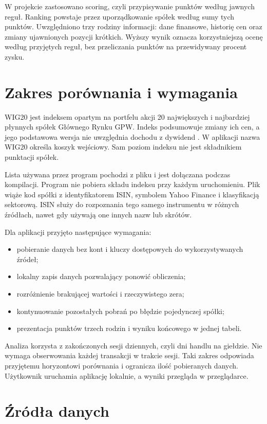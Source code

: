\documentclass[12pt,a4paper,twoside]{report}
\begin{document}
W projekcie zastosowano scoring, czyli przypisywanie punktów według jawnych reguł. Ranking powstaje przez uporządkowanie spółek według sumy tych punktów. Uwzględniono trzy rodziny informacji: dane finansowe, historię cen oraz zmiany ujawnionych pozycji krótkich. Wyższy wynik oznacza korzystniejszą ocenę według przyjętych reguł, bez przeliczania punktów na przewidywany procent zysku.

\section{Zakres porównania i wymagania}

WIG20 jest indeksem opartym na portfelu akcji 20 największych i najbardziej płynnych spółek Głównego Rynku GPW. Indeks podsumowuje zmiany ich cen, a jego podstawowa wersja nie uwzględnia dochodu z dywidend \cite{gpwbenchmark}. W aplikacji nazwa WIG20 określa koszyk wejściowy. Sam poziom indeksu nie jest składnikiem punktacji spółek.

Lista używana przez program pochodzi z pliku  i jest dołączana podczas kompilacji. Program nie pobiera składu indeksu przy każdym uruchomieniu. Plik wiąże kod spółki z identyfikatorem ISIN, symbolem Yahoo Finance i klasyfikacją sektorową. ISIN służy do rozpoznania tego samego instrumentu w różnych źródłach, nawet gdy używają one innych nazw lub skrótów.

Dla aplikacji przyjęto następujące wymagania:
\begin{itemize}
    \item pobieranie danych bez kont i kluczy dostępowych do wykorzystywanych źródeł;
    \item lokalny zapis danych pozwalający ponowić obliczenia;
    \item rozróżnienie brakującej wartości i rzeczywistego zera;
    \item kontynuowanie pozostałych pobrań po błędzie pojedynczej spółki;
    \item prezentacja punktów trzech rodzin i wyniku końcowego w jednej tabeli.
\end{itemize}

Analiza korzysta z zakończonych sesji dziennych, czyli dni handlu na giełdzie. Nie wymaga obserwowania każdej transakcji w trakcie sesji. Taki zakres odpowiada przyjętemu horyzontowi porównania i ogranicza ilość pobieranych danych. Użytkownik uruchamia aplikację lokalnie, a wyniki przegląda w przeglądarce.

\section{Źródła danych}
\end{document}
